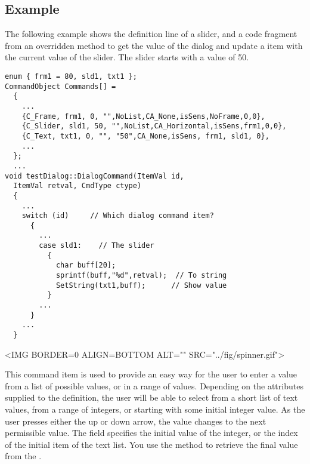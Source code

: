 \subsection* {Example}

The following example shows the definition line of a slider, and
a code fragment from an overridden  method
to get the value of the dialog and update a  item
with the current value of the slider. The slider starts with a
value of 50.

\footnotesize
\begin{verbatim}
enum { frm1 = 80, sld1, txt1 };
CommandObject Commands[] =
  {
    ...
    {C_Frame, frm1, 0, "",NoList,CA_None,isSens,NoFrame,0,0},
    {C_Slider, sld1, 50, "",NoList,CA_Horizontal,isSens,frm1,0,0},
    {C_Text, txt1, 0, "", "50",CA_None,isSens, frm1, sld1, 0},
    ...
  };
  ...
void testDialog::DialogCommand(ItemVal id,
  ItemVal retval, CmdType ctype)
  { 
    ...
    switch (id)     // Which dialog command item?
      {
        ...
        case sld1:    // The slider
          {
            char buff[20];
            sprintf(buff,"%d",retval);  // To string
            SetString(txt1,buff);      // Show value
          }
        ...
      }
    ...
  }

\end{verbatim}
\normalfont\normalsize


\small
\begin{rawhtml}
<IMG BORDER=0 ALIGN=BOTTOM ALT="" SRC="../fig/spinner.gif">
\end{rawhtml}
\begin{latexonly}

\end{latexonly}
\normalfont\normalsize
\vspace{.1in}

This command item is used to provide an easy way for the user to
enter a value from a list of possible values, or in a range of values.
Depending on the attributes supplied to the 
definition, the user will be able to select from a short list of
text values, from a range of integers, or starting with some
initial integer value. As the user presses either the up or down
arrow, the value changes to the next permissible value. The
 field specifies the initial value of the integer,
or the index of the initial item of the text list. You use the
 method to retrieve the final value from the
.

